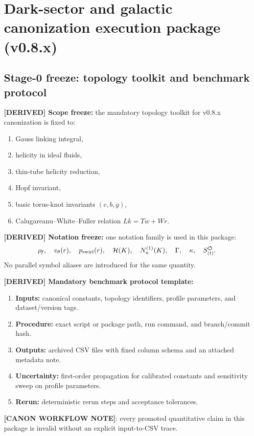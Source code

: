 \section{Dark-sector and galactic canonization execution package (v0.8.x)}
\label{sec:dark-sector-execution-package}

\subsection{Stage-0 freeze: topology toolkit and benchmark protocol}
\textbf{[DERIVED] Scope freeze:} the mandatory topology toolkit for v0.8.x canonization is fixed to:
\begin{enumerate}
    \item Gauss linking integral,
    \item helicity in ideal fluids,
    \item thin-tube helicity reduction,
    \item Hopf invariant,
    \item basic torus-knot invariants $(c,b,g)$,
    \item Calugareanu--White--Fuller relation $Lk=Tw+Wr$.
\end{enumerate}

\textbf{[DERIVED] Notation freeze:} one notation family is used in this package:
\[
\rho_{\!f},\quad v_\theta(r),\quad p_{\mathrm{swirl}}(r),\quad
\mathcal{H}(K),\quad N_u^{(1)}(K),\quad \Gamma,\quad \kappa,\quad {S_{(t)}^{\boldsymbol{\circlearrowleft}}}.
\]
No parallel symbol aliases are introduced for the same quantity.

\textbf{[DERIVED] Mandatory benchmark protocol template:}
\begin{enumerate}
    \item \textbf{Inputs:} canonical constants, topology identifiers, profile parameters, and dataset/version tags.
    \item \textbf{Procedure:} exact script or package path, run command, and branch/commit hash.
    \item \textbf{Outputs:} archived CSV files with fixed column schema and an attached metadata note.
    \item \textbf{Uncertainty:} first-order propagation for calibrated constants and sensitivity sweep on profile parameters.
    \item \textbf{Rerun:} deterministic rerun steps and acceptance tolerances.
\end{enumerate}

\textbf{[CANON WORKFLOW NOTE]}: every promoted quantitative claim in this package is invalid without an explicit input-to-CSV trace.

